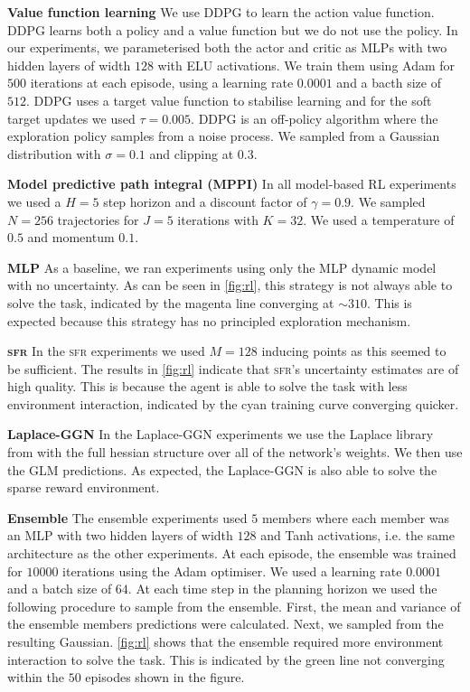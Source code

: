 \documentclass{article}
\newcommand{\our}{\textsc{sfr}\xspace}
\begin{document}
\textbf{Value function learning}
We use DDPG to learn the action value function.
DDPG learns both a policy and a value function but we do not use the policy.
In our experiments, we parameterised both the actor and critic as MLPs with two hidden layers of width $128$ with ELU activations.
We train them using Adam for $500$ iterations at each episode, using a learning rate $0.0001$ and a bacth size of $512$.
DDPG uses a target value function to stabilise learning and for the soft target updates
we used $\tau = 0.005$.
DDPG is an off-policy algorithm where the exploration policy samples from a noise process.
We sampled from a Gaussian distribution with $\sigma=0.1$ and clipping at $0.3$.

\textbf{Model predictive path integral (MPPI)}
In all model-based RL experiments we used a $H=5$ step horizon and a discount factor of $\gamma=0.9$.
We sampled $N=256$ trajectories for $J=5$ iterations with $K=32$.
We used a temperature of $0.5$ and momentum $0.1$.



\textbf{MLP}
As a baseline, we ran experiments using only the MLP dynamic model with no uncertainty.
As can be seen in \cref{fig:rl}, this strategy is not always able to solve the task, indicated by
the magenta line converging at $\sim 310$.
This is expected because this strategy has no principled exploration mechanism.


\textbf{\our}
In the \our experiments we used $M=128$ inducing points as this seemed to be sufficient.
The results in \cref{fig:rl} indicate that \our's uncertainty estimates are of high quality.
This is because the agent is able to solve the task with less environment interaction, indicated
by the cyan training curve converging quicker.

\textbf{Laplace-GGN}
In the Laplace-GGN experiments we use the Laplace library from \cite{daxberger2021laplace}
with the full hessian structure over all of the network's weights.
We then use the GLM predictions.
As expected, the Laplace-GGN is also able to solve the sparse reward environment.


\textbf{Ensemble}
The ensemble experiments used $5$ members where each member was an MLP with two hidden layers of width $128$ and Tanh activations, i.e. the same architecture as the other experiments.
At each episode, the ensemble was trained for $10000$ iterations using the Adam optimiser.
We used a learning rate $0.0001$ and a batch size of $64$.
At each time step in the planning horizon we used the following procedure to sample from the ensemble.
First, the mean and variance of the ensemble members predictions were calculated.
Next, we sampled from the resulting Gaussian.
\cref{fig:rl} shows that the ensemble required more environment interaction to solve the task.
This is indicated by the green line not converging within the $50$ episodes shown in the figure.
\end{document}
